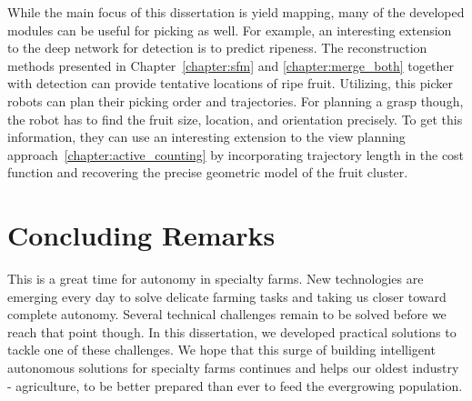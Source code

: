 While the main focus of this dissertation is yield mapping, many of the developed modules can be useful for picking as well. For example, an interesting extension to the deep network for detection is to predict ripeness. The reconstruction methods presented in Chapter~\ref{chapter:sfm} and \ref{chapter:merge_both} together with detection can provide tentative locations of ripe fruit. Utilizing, this picker robots can plan their picking order and trajectories. For planning a grasp though, the robot has to find the fruit size, location, and orientation precisely. To get this information, they can use an interesting extension to the view planning approach~\ref{chapter:active_counting} by incorporating trajectory length in the cost function and recovering the precise geometric model of the fruit cluster. 


\section{Concluding Remarks}
This is a great time for autonomy in specialty farms. New technologies are emerging every day to solve delicate farming tasks and taking us closer toward complete autonomy. Several technical challenges remain to be solved before we reach that point though. In this dissertation, we developed practical solutions to tackle one of these challenges. We hope that this surge of building intelligent autonomous solutions for specialty farms continues and helps our oldest industry - agriculture,  to be better prepared than ever to feed the evergrowing population.